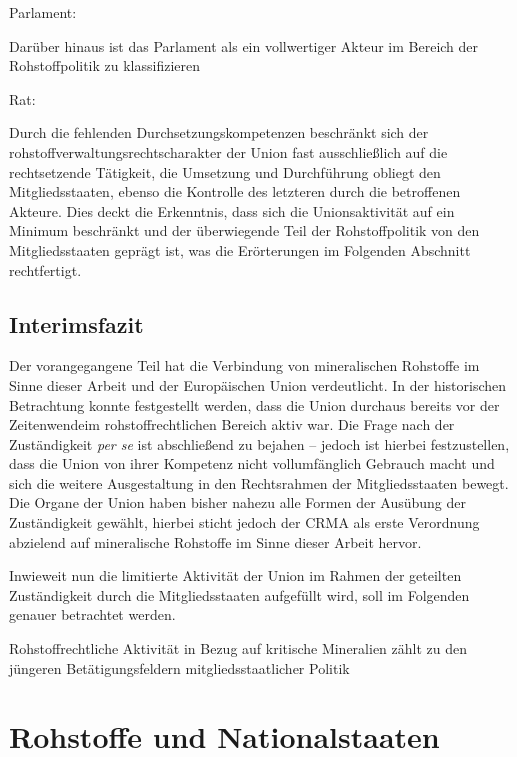 \documentclass[12pt,a4paper,oneside]{book} %
\begin{document}
Parlament: 

Darüber hinaus ist das Parlament als ein vollwertiger Akteur im Bereich der Rohstoffpolitik zu klassifizieren

Rat:



Durch die fehlenden Durchsetzungskompetenzen beschränkt sich der rohstoffverwaltungsrechtscharakter der Union fast ausschließlich auf die rechtsetzende Tätigkeit, die Umsetzung und Durchführung obliegt den Mitgliedsstaaten, ebenso die Kontrolle des letzteren durch die betroffenen Akteure. Dies deckt die Erkenntnis, dass sich die Unionsaktivität auf ein Minimum beschränkt und der überwiegende Teil der Rohstoffpolitik von den Mitgliedsstaaten geprägt ist, was die Erörterungen im Folgenden Abschnitt rechtfertigt.
	
	
	\subsection{Interimsfazit}
	Der vorangegangene Teil hat die Verbindung von mineralischen Rohstoffe im Sinne dieser Arbeit und der Europäischen Union verdeutlicht. In der historischen Betrachtung konnte festgestellt werden, dass die Union durchaus bereits vor der \glqq Zeitenwende\grqq im rohstoffrechtlichen Bereich aktiv war.
	Die Frage nach der Zuständigkeit \textit{per se} ist abschließend zu bejahen -- jedoch ist hierbei festzustellen, dass die Union von ihrer Kompetenz nicht vollumfänglich Gebrauch macht und sich die weitere Ausgestaltung in den Rechtsrahmen der Mitgliedsstaaten bewegt.
	Die Organe der Union haben bisher nahezu alle Formen der Ausübung der Zuständigkeit gewählt, hierbei sticht jedoch der CRMA als erste Verordnung abzielend auf mineralische Rohstoffe im Sinne dieser Arbeit hervor.
	
	Inwieweit nun die limitierte Aktivität der Union im Rahmen der geteilten Zuständigkeit durch die Mitgliedsstaaten aufgefüllt wird, soll im Folgenden genauer betrachtet
	 werden.
	 
	 Rohstoffrechtliche Aktivität in Bezug auf kritische Mineralien zählt zu den jüngeren Betätigungsfeldern mitgliedsstaatlicher Politik
	
	
	 
	
	\section{Rohstoffe und Nationalstaaten}
	
\end{document}
